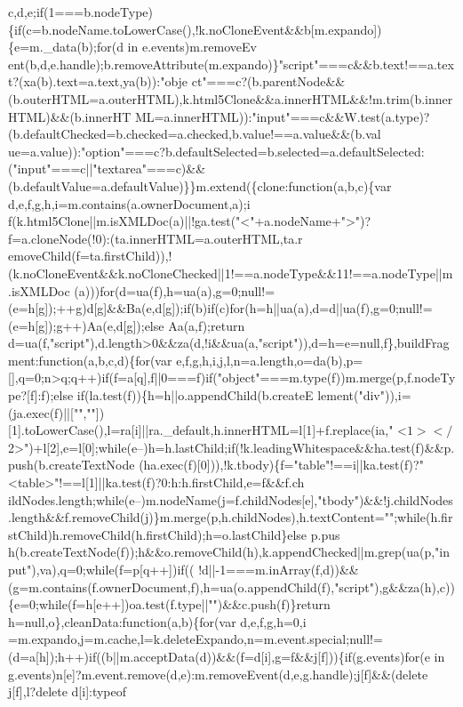 \begin{DoxyCode}
{       c,d,e;if(1===b.nodeType)\{if(c=b.nodeName.toLowerCase(),!k.noCloneEvent&&b[m.expando])\{e=m.\_data(b);for(d in
       e.events)m.removeEv
      ent(b,d,e.handle);b.removeAttribute(m.expando)\}"script"===c&&b.text!==a.text?(xa(b).text=a.text,ya(b)):"obje
      ct"===c?(b.parentNode&&(b.outerHTML=a.outerHTML),k.html5Clone&&a.innerHTML&&!m.trim(b.innerHTML)&&(b.innerHT
      ML=a.innerHTML)):"input"===c&&W.test(a.type)?(b.defaultChecked=b.checked=a.checked,b.value!==a.value&&(b.val
      ue=a.value)):"option"===c?b.defaultSelected=b.selected=a.defaultSelected:("input"===c||"textarea"===c)&&(b.defaultValue=a.defaultValue)\}\}m.extend(\{clone:function(a,b,c)\{var
       d,e,f,g,h,i=m.contains(a.ownerDocument,a);i
      f(k.html5Clone||m.isXMLDoc(a)||!ga.test("<"+a.nodeName+">")?f=a.cloneNode(!0):(ta.innerHTML=a.outerHTML,ta.r
      emoveChild(f=ta.firstChild)),!(k.noCloneEvent&&k.noCloneChecked||1!==a.nodeType&&11!==a.nodeType||m.isXMLDoc
      (a)))for(d=ua(f),h=ua(a),g=0;null!=(e=h[g]);++g)d[g]&&Ba(e,d[g]);if(b)if(c)for(h=h||ua(a),d=d||ua(f),g=0;null!=(e=h[g]);g++)Aa(e,d[g]);else Aa(a,f);return
       d=ua(f,"script"),d.length>0&&za(d,!i&&ua(a,"script")),d=h=e=null,f\},buildFragment:function(a,b,c,d)\{for(var
       e,f,g,h,i,j,l,n=a.length,o=da(b),p=[],q=0;n>q;q++)if(f=a[q],f||0===f)if("object"===m.type(f))m.merge(p,f.nodeType?[f]:f);else
       if(la.test(f))\{h=h||o.appendChild(b.createE
      lement("div")),i=(ja.exec(f)||["",""])[1].toLowerCase(),l=ra[i]||ra.\_default,h.innerHTML=l[1]+f.replace(ia,"
      <$1></$2>")+l[2],e=l[0];while(e--)h=h.lastChild;if(!k.leadingWhitespace&&ha.test(f)&&p.push(b.createTextNode
      (ha.exec(f)[0])),!k.tbody)\{f="table"!==i||ka.test(f)?"<table>"!==l[1]||ka.test(f)?0:h:h.firstChild,e=f&&f.ch
      ildNodes.length;while(e--)m.nodeName(j=f.childNodes[e],"tbody")&&!j.childNodes.length&&f.removeChild(j)\}m.merge(p,h.childNodes),h.textContent="";while(h.firstChild)h.removeChild(h.firstChild);h=o.lastChild\}else
       p.pus
      h(b.createTextNode(f));h&&o.removeChild(h),k.appendChecked||m.grep(ua(p,"input"),va),q=0;while(f=p[q++])if((
      !d||-1===m.inArray(f,d))&&(g=m.contains(f.ownerDocument,f),h=ua(o.appendChild(f),"script"),g&&za(h),c))\{e=0;while(f=h[e++])oa.test(f.type||"")&&c.push(f)\}return h=null,o\},cleanData:function(a,b)\{for(var
       d,e,f,g,h=0,i
      =m.expando,j=m.cache,l=k.deleteExpando,n=m.event.special;null!=(d=a[h]);h++)if((b||m.acceptData(d))&&(f=d[i],g=f&&j[f]))\{if(g.events)for(e in
       g.events)n[e]?m.event.remove(d,e):m.removeEvent(d,e,g.handle);j[f]&&(delete j[f],l?delete d[i]:typeof
}
\end{DoxyCode}
